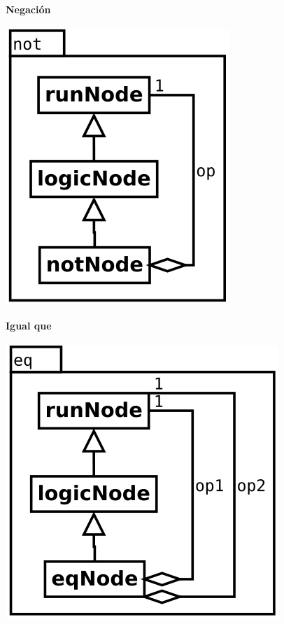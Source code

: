 \paragraph {Negación}
\begin{center}
\includegraphics[scale=0.4]{not.png} \\
\end{center}


\paragraph {Igual que}
\begin{center}
\includegraphics[scale=0.4]{eq.png} \\
\end{center}


